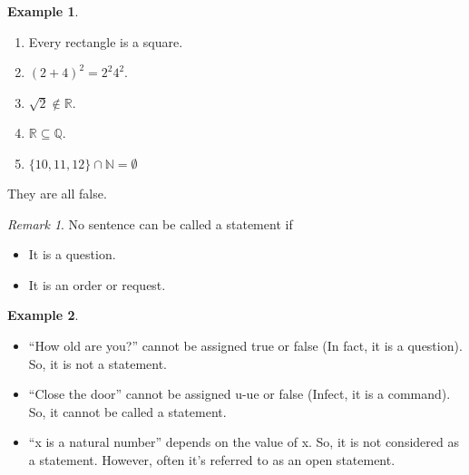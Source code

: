 \documentclass[
]{book}
\providecommand{\tightlist}{%
  \setlength{\itemsep}{0pt}\setlength{\parskip}{0pt}}
\theoremstyle{definition}
\theoremstyle{definition}
\newtheorem{example}{Example}[chapter]
\theoremstyle{definition}
\theoremstyle{definition}
\theoremstyle{remark}
\newtheorem*{remark}{Remark}
\begin{document}
\begin{example}
\protect\hypertarget{exm:unnamed-chunk-3}{}\label{exm:unnamed-chunk-3}\leavevmode

\begin{enumerate}
\def\labelenumi{(\roman{enumi})}
\tightlist
\item
  Every rectangle is a square.
\item
  \((2 +4)^2 = 2^2 4^2\).
\item
  \(\sqrt{2}\not\in\mathbb{R}\).
\item
  \(\mathbb{R} \subseteq \mathbb{Q}\).
\item
  \(\{10, 11, 12\} \cap \mathbb{N}=\emptyset\)
\end{enumerate}

They are all false.

\end{example}

\begin{remark}

No sentence can be called a statement if

\begin{itemize}
\tightlist
\item
  It is a question.
\item
  It is an order or request.
\end{itemize}

\end{remark}

\begin{example}
\protect\hypertarget{exm:unnamed-chunk-5}{}\label{exm:unnamed-chunk-5}\leavevmode

\begin{itemize}
\tightlist
\item
  ``How old are you?'' cannot be assigned true or false (In fact, it is a
  question). So, it is not a statement.
\item
  ``Close the door'' cannot be assigned u-ue or false (Infect, it is a
  command). So, it cannot be called a statement.
\item
  ``x is a natural number'' depends on the value of x. So, it is not
  considered as a statement. However, often it's referred to as an
  open statement.
\end{itemize}

\end{example}
\end{document}
